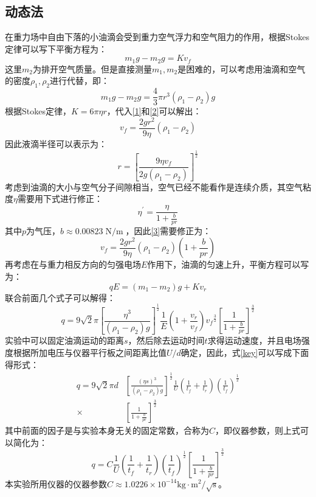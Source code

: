 \documentclass{WHUReport}
\begin{document}
\begin{multicols}{2}
	\subsection{动态法}
	在重力场中自由下落的小油滴会受到重力空气浮力和空气阻力的作用，根据Stokes定律可以写下平衡方程为：
	\begin{equation}\label{1}
		m_1 g-m_2g=Kv_f
	\end{equation}
	这里$m_2$为排开空气质量。但是直接测量$m_1,m_2$是困难的，可以考虑用油滴和空气的密度$\rho_1,\rho_2$进行代替，即：
	\begin{equation}\label{2}
		m_1 g-m_2g=\frac{4}{3}\pi r^3(\rho_1-\rho_2)g
	\end{equation}
	根据Stokes定律，$K=6\pi\eta r$，代入\ref{1}和\ref{2}可以解出：
	\begin{equation}\label{3}
		v_f=\frac{2gr^2}{9\eta}(\rho_1-\rho_2)
	\end{equation}
	因此液滴半径可以表示为：
	\begin{equation}
		r=\left[\frac{9\eta v_f}{2g(\rho_1-\rho_2)}\right]^{\frac{1}{2}}
	\end{equation}
	考虑到油滴的大小与空气分子间隙相当，空气已经不能看作是连续介质，其空气粘度$\eta$需要用下式进行修正：
	\begin{equation}
		\eta^\prime=\frac{\eta}{1+\frac{b}{pr}}
	\end{equation}
	其中$p$为气压，$b\approx 0.00823\operatorname{N/m}$，因此\ref{3}需要修正为：
	\begin{equation}
		v_f=\frac{2gr^2}{9\eta}(\rho_1-\rho_2)(1+\frac{b}{pr})
	\end{equation}
	再考虑在与重力相反方向的匀强电场$E$作用下，油滴的匀速上升，平衡方程可以写为：
	\begin{equation}
		qE=(m_1-m_2)g+Kv_r
	\end{equation}
	联合前面几个式子可以解得：
	\begin{equation}\label{key}
		q=9\sqrt{2}\pi\left[\frac{\eta^3}{(\rho_1-\rho_2)g}\right]^{\frac{1}{2}}\frac{1}{E}\left(1+\frac{v_r}{v_f}\right){v_f}^{\frac{3}{2}}\left[\frac{1}{1+\frac{b}{pr}}\right]^{\frac{3}{2}}
	\end{equation}
	实验中可以固定油滴运动的距离$s$，然后除去运动时间$t$求得运动速度，并且电场强度根据所加电压与仪器平行板之间距离比值$U/d$确定，因此，式\ref{key}可以写成下面得形式：
	\begin{equation}
		\begin{aligned}
			q=9\sqrt{2}\pi d&\left[\frac{(\eta s)^3}{(\rho_1-\rho_2)g}\right]^{\frac{1}{2}}\frac{1}{U}\left(\frac{1}{t_f}+\frac{1}{t_r}\right)\left(\frac{1}{t_f}\right)^{\frac{1}{2}}\\\times&\left[\frac{1}{1+\frac{b}{pr}}\right]^{\frac{3}{2}}
		\end{aligned}
	\end{equation}
	其中前面的因子是与实验本身无关的固定常数，合称为$C$，即仪器参数，则上式可以简化为：
	\begin{equation}\label{key2}
		q=C\frac{1}{U}\left(\frac{1}{t_f}+\frac{1}{t_r}\right)\left(\frac{1}{t_f}\right)^{\frac{1}{2}}\left[\frac{1}{1+\frac{b}{pr}}\right]^{\frac{3}{2}}
	\end{equation}
	本实验所用仪器的仪器参数$C\approx 1.0226\times10^{-14}\operatorname{kg\cdot m^2/\sqrt{s}}$。

\end{multicols}
\end{document}
